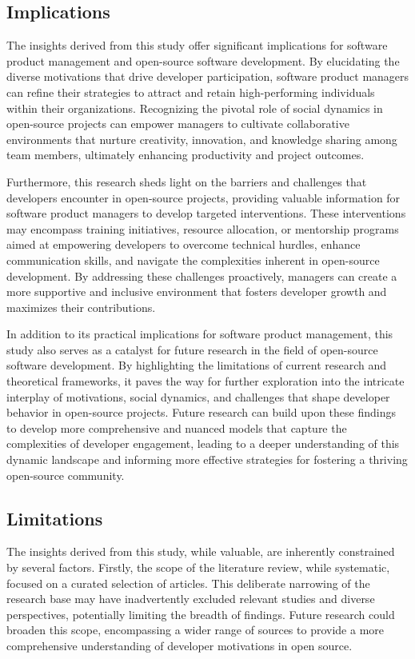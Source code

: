 \subsection{Implications}

The insights derived from this study offer significant implications for software product management and open-source software development. By elucidating the diverse motivations that drive developer participation, software product managers can refine their strategies to attract and retain high-performing individuals within their organizations. Recognizing the pivotal role of social dynamics in open-source projects can empower managers to cultivate collaborative environments that nurture creativity, innovation, and knowledge sharing among team members, ultimately enhancing productivity and project outcomes.

Furthermore, this research sheds light on the barriers and challenges that developers encounter in open-source projects, providing valuable information for software product managers to develop targeted interventions. These interventions may encompass training initiatives, resource allocation, or mentorship programs aimed at empowering developers to overcome technical hurdles, enhance communication skills, and navigate the complexities inherent in open-source development. By addressing these challenges proactively, managers can create a more supportive and inclusive environment that fosters developer growth and maximizes their contributions.

In addition to its practical implications for software product management, this study also serves as a catalyst for future research in the field of open-source software development. By highlighting the limitations of current research and theoretical frameworks, it paves the way for further exploration into the intricate interplay of motivations, social dynamics, and challenges that shape developer behavior in open-source projects. Future research can build upon these findings to develop more comprehensive and nuanced models that capture the complexities of developer engagement, leading to a deeper understanding of this dynamic landscape and informing more effective strategies for fostering a thriving open-source community.


\subsection{Limitations}

The insights derived from this study, while valuable, are inherently constrained by several factors. Firstly, the scope of the literature review, while systematic, focused on a curated selection of articles. This deliberate narrowing of the research base may have inadvertently excluded relevant studies and diverse perspectives, potentially limiting the breadth of findings. Future research could broaden this scope, encompassing a wider range of sources to provide a more comprehensive understanding of developer motivations in open source.

